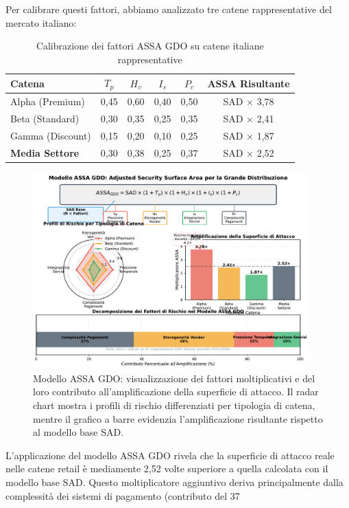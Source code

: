 Per calibrare questi fattori, abbiamo analizzato tre catene rappresentative del mercato italiano:

\begin{table}[htbp]
\centering
\caption{Calibrazione dei fattori ASSA GDO su catene italiane rappresentative}
\label{tab:assa_calibration}
\begin{tabular}{lccccc}
\toprule
\textbf{Catena} & \textbf{$T_p$} & \textbf{$H_v$} & \textbf{$I_s$} & \textbf{$P_c$} & \textbf{ASSA Risultante} \\
\midrule
Alpha (Premium) & 0,45 & 0,60 & 0,40 & 0,50 & SAD × 3,78 \\
Beta (Standard) & 0,30 & 0,35 & 0,25 & 0,35 & SAD × 2,41 \\
Gamma (Discount) & 0,15 & 0,20 & 0,10 & 0,25 & SAD × 1,87 \\
\midrule
\textbf{Media Settore} & 0,30 & 0,38 & 0,25 & 0,37 & SAD × 2,52 \\
\bottomrule
\end{tabular}
\end{table}

\begin{figure}[htbp]
\centering
\includegraphics[width=0.95\textwidth]{thesis_figures/cap2/fig_2_6_assa_gdo_model.pdf}
\caption{Modello ASSA GDO: visualizzazione dei fattori moltiplicativi e del loro contributo all'amplificazione della superficie di attacco. Il radar chart mostra i profili di rischio differenziati per tipologia di catena, mentre il grafico a barre evidenzia l'amplificazione risultante rispetto al modello base SAD.}
\label{fig:assa_gdo_model}
\end{figure}

L'applicazione del modello ASSA GDO rivela che la superficie di attacco reale nelle catene retail è mediamente 2,52 volte superiore a quella calcolata con il modello base SAD. Questo moltiplicatore aggiuntivo deriva principalmente dalla complessità dei sistemi di pagamento (contributo del 37%

